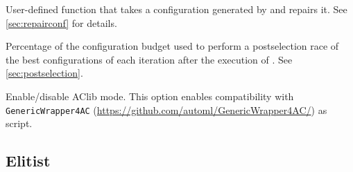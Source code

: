 \begin{description}
User-defined \aR function that takes a configuration generated by \irace and repairs it. See \autoref{sec:repairconf} for details.

Percentage of the configuration budget used to perform a postselection race of the best configurations of each iteration after the execution of \irace. See \autoref{sec:postselection}.

Enable/disable AClib mode. This option enables compatibility with \texttt{GenericWrapper4AC} (\url{https://github.com/automl/GenericWrapper4AC/}) as  script.

\end{description}

\subsection[Elitist irace]{Elitist \irace}
